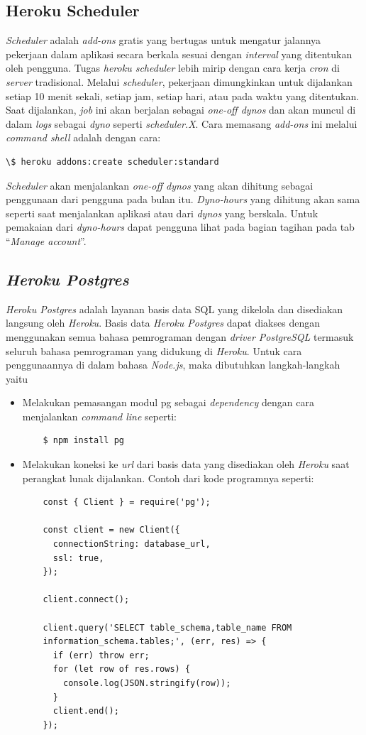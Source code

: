 \subsection{Heroku Scheduler}
\textit{Scheduler} adalah \textit{add-ons} gratis yang bertugas untuk mengatur jalannya pekerjaan dalam aplikasi secara berkala sesuai dengan \textit{interval} yang ditentukan oleh pengguna. Tugas \textit{heroku scheduler} lebih mirip dengan cara kerja \textit{cron} di \textit{server} tradisional. Melalui \textit{scheduler}, pekerjaan dimungkinkan untuk dijalankan setiap 10 menit sekali, setiap jam, setiap hari, atau pada waktu yang ditentukan. Saat dijalankan, \textit{job} ini akan berjalan sebagai \textit{one-off dynos} dan akan muncul di dalam \textit{logs} sebagai \textit{dyno} seperti \textit{scheduler.X}. Cara memasang \textit{add-ons} ini melalui \textit{command shell} adalah dengan cara:
\begin{lstlisting}
\$ heroku addons:create scheduler:standard
\end{lstlisting}
\textit{Scheduler} akan menjalankan \textit{one-off dynos} yang akan dihitung sebagai penggunaan dari pengguna pada bulan itu. \textit{Dyno-hours} yang dihitung akan sama seperti saat menjalankan aplikasi atau dari \textit{dynos} yang berskala. Untuk pemakaian dari \textit{dyno-hours} dapat pengguna lihat pada bagian tagihan pada tab ``\textit{Manage account}''. 

\subsection{\textit{Heroku Postgres}}
\textit{Heroku Postgres} adalah layanan basis data SQL yang dikelola dan disediakan langsung oleh \textit{Heroku}. Basis data \textit{Heroku Postgres} dapat diakses dengan menggunakan semua bahasa pemrograman dengan \textit{driver PostgreSQL} termasuk seluruh bahasa pemrograman yang didukung di \textit{Heroku}. Untuk cara penggunaannya di dalam bahasa \textit{Node.js}, maka dibutuhkan langkah-langkah yaitu 
\begin{itemize}
    \item Melakukan pemasangan modul pg sebagai \textit{dependency} dengan cara menjalankan \textit{command line} seperti:
    \begin{lstlisting}
    $ npm install pg 
    \end{lstlisting}
    \item Melakukan koneksi ke \textit{url} dari basis data yang disediakan oleh \textit{Heroku} saat perangkat lunak dijalankan. Contoh dari kode programnya seperti:
    \begin{lstlisting}
    const { Client } = require('pg');

    const client = new Client({
      connectionString: database_url,
      ssl: true,
    });
    
    client.connect();
    
    client.query('SELECT table_schema,table_name FROM
    information_schema.tables;', (err, res) => {
      if (err) throw err;
      for (let row of res.rows) {
        console.log(JSON.stringify(row));
      }
      client.end();
    });
    \end{lstlisting}
\end{itemize}
